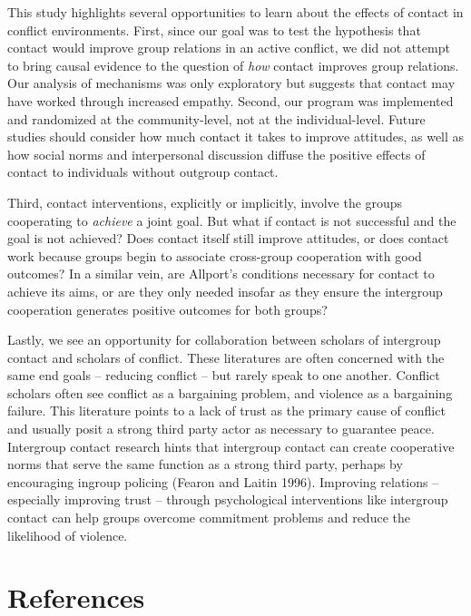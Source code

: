 \documentclass[11pt]{article}
\begin{document}
This study highlights several opportunities to learn about the effects
of contact in conflict environments. First, since our goal was to test
the hypothesis that contact would improve group relations in an active
conflict, we did not attempt to bring causal evidence to the question of
\emph{how} contact improves group relations. Our analysis of mechanisms
was only exploratory but suggests that contact may have worked through
increased empathy. Second, our program was implemented and randomized at
the community-level, not at the individual-level. Future studies should
consider how much contact it takes to improve attitudes, as well as how
social norms and interpersonal discussion diffuse the positive effects
of contact to individuals without outgroup contact.

Third, contact interventions, explicitly or implicitly, involve the
groups cooperating to \emph{achieve} a joint goal. But what if contact
is not successful and the goal is not achieved? Does contact itself
still improve attitudes, or does contact work because groups begin to
associate cross-group cooperation with good outcomes? In a similar vein,
are Allport's conditions necessary for contact to achieve its aims, or
are they only needed insofar as they ensure the intergroup cooperation
generates positive outcomes for both groups?

Lastly, we see an opportunity for collaboration between scholars of
intergroup contact and scholars of conflict. These literatures are often
concerned with the same end goals -- reducing conflict -- but rarely
speak to one another. Conflict scholars often see conflict as a
bargaining problem, and violence as a bargaining failure. This
literature points to a lack of trust as the primary cause of conflict
and usually posit a strong third party actor as necessary to guarantee
peace. Intergroup contact research hints that intergroup contact can
create cooperative norms that serve the same function as a strong third
party, perhaps by encouraging ingroup policing (Fearon and Laitin 1996).
Improving relations -- especially improving trust -- through
psychological interventions like intergroup contact can help groups
overcome commitment problems and reduce the likelihood of violence.

\hypertarget{references}{%
\section*{References}\label{references}}
\end{document}

